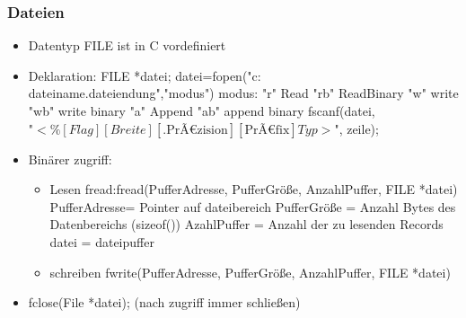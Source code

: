 \documentclass[10pt,a5paper]{article}
\begin{document}
\subsubsection{Dateien}
\begin{itemize}
\item Datentyp FILE ist in C vordefiniert
\item Deklaration: FILE *datei;
\subitem datei=fopen("c:\\dateiname.dateiendung","modus") \subitem modus: "r" Read "rb" ReadBinary "w" write "wb" write binary "a" Append "ab" append binary
\subitem fscanf(datei,\ensuremath{\text{"}< \%[Flag][Breite][\text{.PrÃ€zision}][\text{PrÃ€fix}]Typ>\text{"}}, zeile);
\item Binärer zugriff:\begin{itemize}
\item Lesen fread:\subitem fread(Puffer\textunderscore Adresse, Puffer\textunderscore Größe, Anzahl\textunderscore Puffer, FILE *datei)
\subitem Puffer\textunderscore Adresse=  Pointer auf dateibereich
\subitem Puffer\textunderscore Größe = Anzahl Bytes des Datenbereichs (sizeof())
\subitem Azahl\textunderscore Puffer = Anzahl der zu lesenden Records
\subitem datei = dateipuffer
\item schreiben fwrite(Puffer\textunderscore Adresse, Puffer\textunderscore Größe, Anzahl\textunderscore Puffer, FILE *datei)
\end{itemize}
\item fclose(File *datei); (nach zugriff immer schließen)
\end{itemize}
\end{document}
